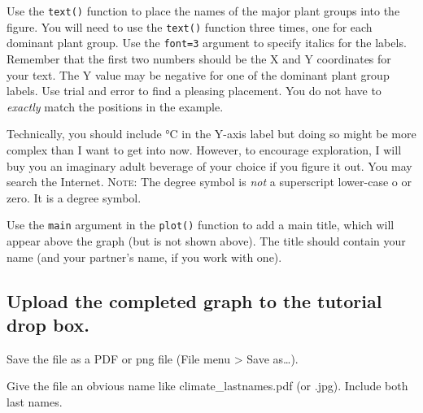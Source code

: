 \documentclass[11pt]{article}
\begin{document}
	Use the \texttt{text()} function to place the names of the major plant groups
	into the figure. You will need to use the \texttt{text()} function
	three times, one for each dominant plant group. Use the \texttt{font=3}
	argument to specify italics for the labels. Remember that the first two
	numbers should be the X and Y coordinates for your text. The Y value may
	be negative for one of the dominant plant group labels. Use trial and error to find a pleasing placement. You do not have to \emph{exactly} match the positions in the example.
	
	Technically, you should include °C in the Y-axis label but doing so might be
	more complex than I want to get into now. However, to encourage
	exploration, I will buy you an imaginary adult beverage of your choice if %
	you figure it out. You may search the Internet. \textsc{Note:} The degree symbol is \emph{not} a superscript lower-case o or zero. It is a degree symbol. 
	
	Use the \texttt{main} argument in the \texttt{plot()} function to add
	a main title, which will appear above the graph (but is not shown
	above). The title should contain your name (and your partner's name, if you work with one).
	
	
	\subsection*{Upload the completed graph to the tutorial drop box.}
	
	Save the file as a PDF or png file (File menu \textgreater{} Save
	as\ldots{}).
	
	Give the file an obvious name like climate\_lastnames.pdf (or .jpg).
	Include both last names. 
	
\end{document}
